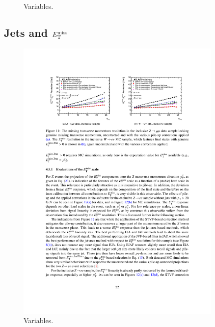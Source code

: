 \begin{figure}[tp]
  \caption{Variables.}
  \label{fig:strategy-objects-electron}
\end{figure}

\subsection{Jets and $E_{\mathrm{T}}^{\mathrm{miss}}$}
\label{sec:strategy-hadronic}

\begin{figure}[tp]
  \centering
  \includegraphics[width=0.90\textwidth]{figures/performance/met-resolutionvsnpv}
  \caption{Variables.}
  \label{fig:strategy-objects-met-resolution}
\end{figure}

